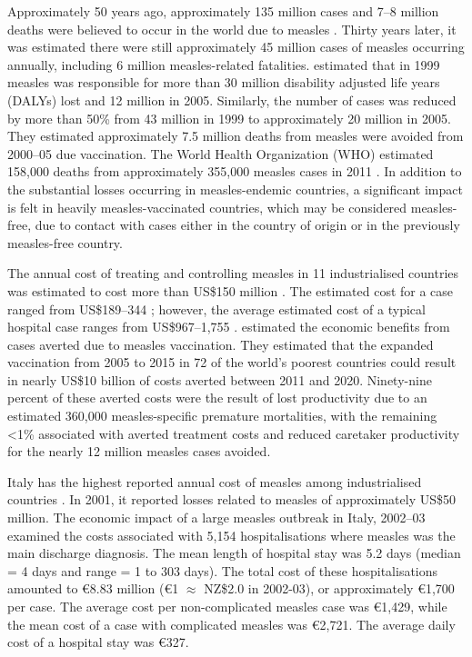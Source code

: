 \documentclass{article}
\begin{document}
Approximately 50 years ago, approximately 135 million cases and 7--8 million deaths were believed to occur in the world due to measles \citep{clements4}. Thirty years later, it was estimated there were still approximately 45 million cases of measles occurring annually, including 6 million measles-related fatalities. \citep{wolfson7} estimated that in 1999 measles was responsible for more than 30 million disability adjusted life years (DALYs) lost and 12 million in 2005. Similarly, the number of cases was reduced by more than 50\% from 43 million in 1999 to approximately 20 million in 2005. They estimated approximately 7.5 million deaths from measles were avoided from 2000--05 due vaccination. The World Health Organization (WHO) estimated 158,000 deaths from approximately 355,000 measles cases in 2011 \citep{who13}.  In addition to the substantial losses occurring in measles-endemic countries, a significant impact is felt in heavily measles-vaccinated countries, which may be considered measles-free, due to contact with cases either in the country of origin or in the previously measles-free country.

The annual cost of treating and controlling measles in 11 industrialised countries was estimated to cost more than US\$150 million \citep{carabin3}. The estimated cost for a case ranged from US\$189--344 \citep{carabin3}; however, the average estimated cost of a typical hospital case ranges from US\$967--1,755 \citep{carabin2}. \citep{stack11} estimated the economic benefits from cases averted due to measles vaccination. They estimated that the expanded vaccination from 2005 to 2015 in 72 of the world's poorest countries could result in nearly US\$10 billion of costs averted between 2011 and 2020. Ninety-nine percent of these averted costs were the result of lost productivity due to an estimated 360,000 measles-specific premature mortalities, with the remaining <1\% associated with averted treatment costs and reduced caretaker productivity for the nearly 12 million measles cases avoided.

Italy has the highest reported annual cost of measles among industrialised countries \citep{carabin3}. In 2001, it reported losses related to measles of approximately US\$50 million. The economic impact of a large measles outbreak in Italy, 2002--03 examined the costs associated with 5,154 hospitalisations where measles was the main discharge diagnosis. The mean length of hospital stay was 5.2 days (median = 4 days and range = 1 to 303 days). The total cost of these hospitalisations amounted to \euro 8.83 million (\euro 1 $\approx$ NZ\$2.0 in 2002-03), or approximately \euro 1,700 per case. The average cost per non-complicated measles case was  \euro 1,429, while the mean cost of a case with complicated measles was  \euro 2,721. The average daily cost of a hospital stay was  \euro 327.
\end{document}
